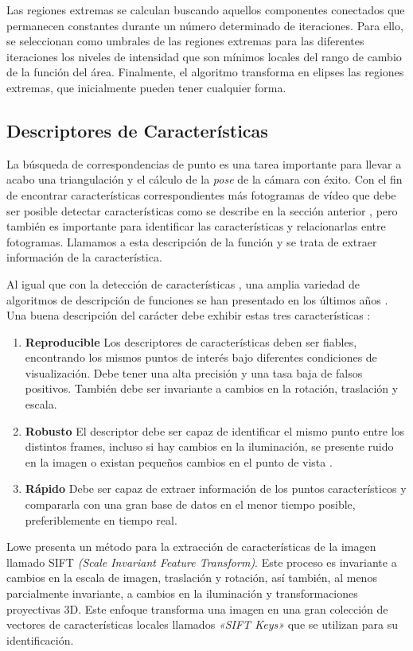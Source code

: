 Las regiones extremas se calculan buscando aquellos componentes conectados que permanecen constantes durante un número determinado de iteraciones. Para ello, se seleccionan como umbrales de las regiones extremas para las diferentes iteraciones los niveles de intensidad que son mínimos locales del rango de cambio de la función del área. Finalmente, el algoritmo transforma en elipses las regiones extremas, que inicialmente pueden tener cualquier forma. 

\subsection{Descriptores de Características}
La búsqueda de correspondencias de punto es una tarea importante para llevar a acabo una triangulación y el cálculo de la \textit{pose} de la cámara con éxito. Con el fin de encontrar características correspondientes más fotogramas de vídeo que debe ser posible detectar características como se describe en la sección anterior , pero también es importante para identificar las características y relacionarlas entre fotogramas. Llamamos a esta descripción de la función y se trata de extraer información de la característica.

Al igual que con la detección de características , una amplia variedad de algoritmos de descripción de funciones se han presentado en los últimos años . Una buena descripción del carácter debe exhibir estas tres características :

\begin{enumerate}
\item \textbf{Reproducible}  Los descriptores de características deben ser fiables, encontrando los mismos puntos de interés bajo diferentes condiciones de visualización. Debe tener una alta precisión y una tasa baja de falsos positivos. También debe ser invariante a cambios en la rotación, traslación y escala.
\item \textbf{Robusto} El descriptor debe ser capaz de identificar el mismo punto entre los distintos frames, incluso si hay cambios en la iluminación, se presente ruido en la imagen o existan pequeños cambios en el  punto de vista .
\item \textbf{Rápido} Debe ser capaz de extraer información de los puntos característicos y compararla con una gran base de datos en el menor tiempo posible, preferiblemente en tiempo real.
\end{enumerate}

Lowe \cite{Lowe} presenta un método para la extracción de características de la imagen llamado SIFT \textit{(Scale Invariant Feature Transform)}. Este proceso es invariante a cambios en la escala de imagen, traslación y rotación, así también, al menos parcialmente invariante, a cambios en la iluminación y transformaciones proyectivas 3D. Este enfoque transforma una imagen en una gran colección de vectores de características locales llamados \emph{«SIFT Keys»} que se utilizan para su identificación.

